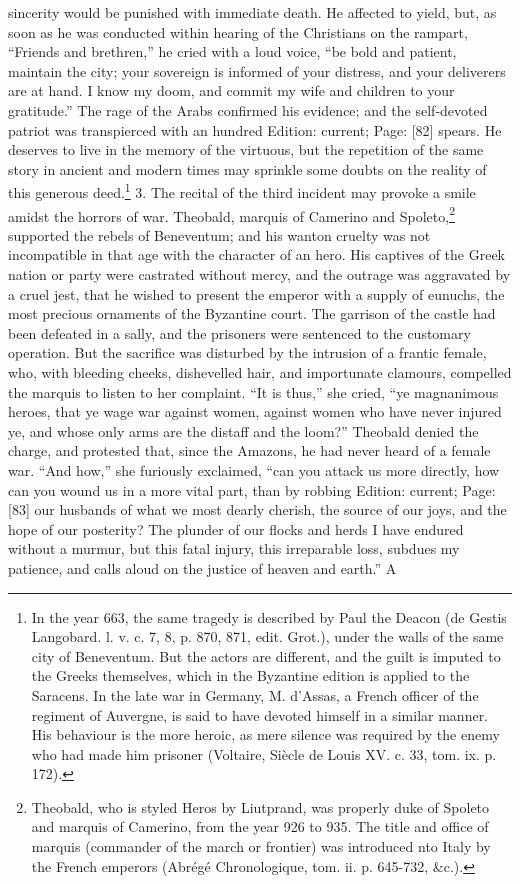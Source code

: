 sincerity would be punished with immediate death. He affected to yield, but, as soon as he was conducted within hearing of the Christians on the rampart, \texthebrew{“}Friends and brethren,\texthebrew{}” he cried with a loud voice, \texthebrew{“}be bold and patient, maintain the city; your sovereign is informed of your distress, and your deliverers are at hand. I know my doom, and commit my wife and children to your gratitude.\texthebrew{}” The rage of the Arabs confirmed his evidence; and the self-devoted patriot was transpierced with an hundred Edition: current; Page: [82] spears. He deserves to live in the memory of the virtuous, but the repetition of the same story in ancient and modern times may sprinkle some doubts on the reality of this generous deed.\footnote{In the year 663, the same tragedy is described by Paul the Deacon (de Gestis Langobard. l. v. c. 7, 8, p. 870, 871, edit. Grot.), under the walls of the same city of Beneventum. But the actors are different, and the guilt is imputed to the Greeks themselves, which in the Byzantine edition is applied to the Saracens. In the late war in Germany, M. d\texthebrew{}’Assas, a French officer of the regiment of Auvergne, is said to have devoted himself in a similar manner. His behaviour is the more heroic, as mere silence was required by the enemy who had made him prisoner (Voltaire, Siècle de Louis XV. c. 33, tom. ix. p. 172).} 3. The recital of the third incident may provoke a smile amidst the horrors of war. Theobald, marquis of Camerino and Spoleto,\footnote{Theobald, who is styled Heros by Liutprand, was properly duke of Spoleto and marquis of Camerino, from the year 926 to 935. The title and office of marquis (commander of the march or frontier) was introduced nto Italy by the French emperors (Abrégé Chronologique, tom. ii. p. 645-732, \&c.).} supported the rebels of Beneventum; and his wanton cruelty was not incompatible in that age with the character of an hero. His captives of the Greek nation or party were castrated without mercy, and the outrage was aggravated by a cruel jest, that he wished to present the emperor with a supply of eunuchs, the most precious ornaments of the Byzantine court. The garrison of the castle had been defeated in a sally, and the prisoners were sentenced to the customary operation. But the sacrifice was disturbed by the intrusion of a frantic female, who, with bleeding cheeks, dishevelled hair, and importunate clamours, compelled the marquis to listen to her complaint. \texthebrew{“}It is thus,\texthebrew{}” she cried, \texthebrew{“}ye magnanimous heroes, that ye wage war against women, against women who have never injured ye, and whose only arms are the distaff and the loom?\texthebrew{}” Theobald denied the charge, and protested that, since the Amazons, he had never heard of a female war. \texthebrew{“}And how,\texthebrew{}” she furiously exclaimed, \texthebrew{“}can you attack us more directly, how can you wound us in a more vital part, than by robbing Edition: current; Page: [83] our husbands of what we most dearly cherish, the source of our joys, and the hope of our posterity? The plunder of our flocks and herds I have endured without a murmur, but this fatal injury, this irreparable loss, subdues my patience, and calls aloud on the justice of heaven and earth.\texthebrew{}” A 